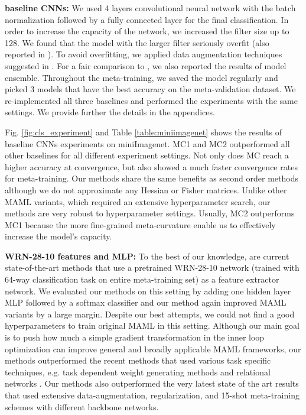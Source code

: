 \documentclass{article}
\begin{document}
\textbf{baseline CNNs:} We used 4 layers convolutional neural network with the batch normalization followed by a fully connected layer for the final classification. In order to increase the capacity of the network, we increased the filter size up to 128. We found that the model with the larger filter seriously overfit (also reported in \cite{Finn-icml-2017}). To avoid overfitting, we applied data augmentation techniques suggested in \cite{autoaugment, cutout}. For a fair comparison to \cite{Antoniou-arxiv-2018}, we also reported the results of model ensemble. Throughout the meta-training, we saved the model regularly and picked 3 models that have the best accuracy on the meta-validation dataset. We re-implemented all three baselines and performed the experiments with the same settings. We provide further the details in the appendices.

Fig. \ref{fig:cls_experiment} and Table \ref{table:miniimagenet} shows the results of baseline CNNs experiments on miniImagenet. MC1 and MC2 outperformed all other baselines for all different experiment settings. Not only does MC reach a higher accuracy at convergence, but also showed a much faster convergence rates for meta-training. Our methods share the same benefits as second order methods although we do not approximate any Hessian or Fisher matrices. Unlike other MAML variants, which required an extensive hyperparameter search, our methods are very robust to hyperparameter settings. Usually, MC2 outperforms MC1 because the more fine-grained meta-curvature enable us to effectively increase the model's capacity.

\textbf{WRN-28-10 features and MLP:} To the best of our knowledge, \cite{rusu-iclr19, Qiao-cvpr18} are current state-of-the-art methods that use a pretrained WRN-28-10 \cite{wrn} network (trained with 64-way classification task on entire meta-training set) as a feature extractor network. We evaluated our methods on this setting by adding one hidden layer MLP followed by a softmax classifier and our method again improved MAML variants by a large margin. Despite our best attempts, we could not find a good hyperparameters to train original MAML in this setting. 
Although our main goal is to push how much a simple gradient transformation in the inner loop optimization can improve general and broadly applicable MAML frameworks, our methods outperformed the recent methods that used various task specific techniques, e.g. task dependent weight generating methods \cite{rusu-iclr19, Qiao-cvpr18} and relational networks \cite{rusu-iclr19}. Our methods also outperformed the very latest state of the art results \cite{metaopt} that used extensive data-augmentation, regularization, and 15-shot meta-training schemes with different backbone networks.
\end{document}
